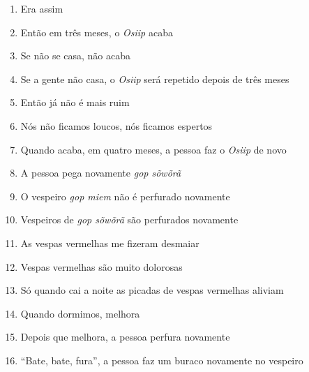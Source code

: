 \begin{enumerate}
 \item Era assim

 \item Então em três meses, o \textit{Osiip} acaba

 \item Se não se casa, não acaba

 \item Se a gente não casa, o \textit{Osiip} será repetido depois de três meses

 \item Então já não é mais ruim

 \item Nós não ficamos loucos, nós ficamos espertos

 \begin{center}\end{center}

 \item Quando acaba, em quatro meses, a pessoa faz o \textit{Osiip} de novo

 \item A pessoa pega novamente \textit{gop sõwõrã}

 \item O vespeiro \textit{gop miem} não é perfurado novamente

 \item Vespeiros de \textit{gop sõwõrã} são perfurados novamente

 \begin{center}\end{center}

 \item As vespas vermelhas me fizeram desmaiar

 \item Vespas vermelhas são muito dolorosas

 \item Só quando cai a noite as picadas de vespas vermelhas aliviam

 \item Quando dormimos, melhora

 \begin{center}\end{center}

 \item Depois que melhora, a pessoa perfura novamente

 \item ``Bate, bate, fura'', a pessoa faz um buraco novamente no vespeiro


\end{enumerate}
